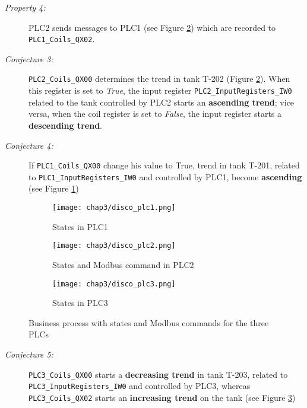\begin{description}
	\item[\colorbox{backcolourtext}{\textnormal{\textit{Property 4:}}}] PLC2 sends messages to PLC1 (see Figure \ref{subfig:pm_plc2}) which are recorded to \texttt{PLC1\_Coils\_QX02}.
	
	\item[\colorbox{backcolourtext}{\textnormal{\textit{Conjecture 3:}}}] \texttt{PLC2\_Coils\_QX00} determines the trend in tank T-202 (Figure \ref{subfig:pm_plc2}). \newline
	When this register is set to \textit{True}, the input register \texttt{PLC2\_InputRegisters\_IW0} related to the tank controlled by PLC2 starts an \textbf{ascending trend}; vice versa, when the coil register is set to \textit{False}, the input register starts a \textbf{descending trend}.
	
	\item[\colorbox{backcolourtext}{\textnormal{\textit{Conjecture 4:}}}] If \texttt{PLC1\_Coils\_QX00} change his value to True, trend in tank T-201, related to \texttt{PLC1\_InputRegisters\_IW0} and controlled by PLC1, become \textbf{ascending} (see Figure \ref{subfig:pm_plc1})
	
\end{description}

\begin{figure}[H]
	\centering
	\begin{subfigure}{0.7\textwidth}
		\texttt{[image: chap3/disco\_plc1.png]}
		\caption{States in PLC1}
		\label{subfig:pm_plc1}
	\end{subfigure}
	\hfill
	\begin{subfigure}{0.48\textwidth}
		\texttt{[image: chap3/disco\_plc2.png]}
		\caption{States and Modbus command in PLC2}
		\label{subfig:pm_plc2}
	\end{subfigure}
	\hfill
	\begin{subfigure}{0.48\textwidth}
		\texttt{[image: chap3/disco\_plc3.png]}
		\caption{States in PLC3}
		\label{subfig:pm_plc3}
	\end{subfigure}
	\caption{Business process with states and Modbus commands for the three PLCs}
	\label{fig:business_process_cecccato}
\end{figure}
\pagebreak

\begin{description}
	\item[\colorbox{backcolourtext}{\textnormal{\textit{Conjecture 5:}}}] \texttt{PLC3\_Coils\_QX00} starts a \textbf{decreasing trend} in tank T-203, related to \texttt{PLC3\_InputRegisters\_IW0} and controlled by PLC3, whereas \texttt{PLC3\_Coils\_QX02} starts an \textbf{increasing trend} on the tank (see Figure \ref{subfig:pm_plc3})
\end{description}

